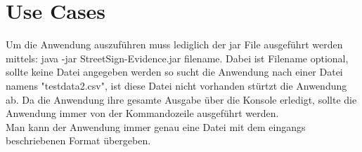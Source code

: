 \chapter{Use Cases}
Um die Anwendung auszuführen muss lediglich der jar File ausgeführt werden mittels:
java -jar StreetSign-Evidence.jar filename. Dabei ist Filename optional, sollte keine Datei
angegeben werden so sucht die Anwendung nach einer Datei namens "testdata2.csv", ist diese
Datei nicht vorhanden stürtzt die Anwendung ab.
Da die Anwendung ihre gesamte Ausgabe über die Konsole erledigt, sollte die Anwendung immer von
der Kommandozeile ausgeführt werden.\\
Man kann der Anwendung immer genau eine Datei mit dem eingangs beschriebenen Format übergeben.

